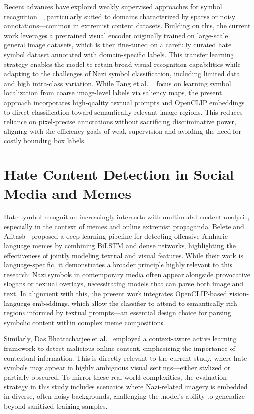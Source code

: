 Recent advances have explored weakly supervised approaches for symbol recognition
~\parencite{tang2017multipleinstancedetectionnetwork}, particularly suited to domains characterized by sparse or
noisy annotations—common in extremist content datasets. Building on this, the current work leverages a pretrained
visual encoder originally trained on large-scale general image datasets, which is then fine-tuned on a carefully
curated hate symbol dataset annotated with domain-specific labels. This transfer learning strategy enables the model
to retain broad visual recognition capabilities while adapting to the challenges of Nazi symbol classification,
including limited data and high intra-class variation. While Tang et al.
~\parencite{tang2017multipleinstancedetectionnetwork} focus on learning symbol localization from coarse image-level
labels via saliency maps, the present approach incorporates high-quality textual prompts and OpenCLIP embeddings to
direct classification toward semantically relevant image regions. This reduces reliance on pixel-precise annotations
without sacrificing discriminative power, aligning with the efficiency goals of weak supervision and avoiding the
need for costly bounding box labels.

\section{Hate Content Detection in Social Media and Memes}

Hate symbol recognition increasingly intersects with multimodal content analysis, especially in the context of memes
and online extremist propaganda. Belete and Alitasb~\parencite{belete2025200258} proposed a deep learning pipeline
for detecting offensive Amharic-language memes by combining \ac{BiLSTM} and dense networks, highlighting the
effectiveness of jointly modeling textual and visual features. While their work is language-specific, it
demonstrates a broader principle highly relevant to this research: Nazi symbols in contemporary media often appear
alongside provocative slogans or textual overlays, necessitating models that can parse both image and text. In
alignment with this, the present work integrates OpenCLIP-based vision-language embeddings, which allow the
classifier to attend to semantically rich regions informed by textual prompts—an essential design choice for parsing
symbolic content within complex meme compositions.

Similarly, Das Bhattacharjee et al.~\parencite{dasbhattacharjee2019365} employed a context-aware active learning
framework to detect malicious online content, emphasizing the importance of contextual information. This is directly
relevant to the current study, where hate symbols may appear in highly ambiguous visual settings—either stylized or
partially obscured. To mirror these real-world complexities, the evaluation strategy in this study includes
scenarios where Nazi-related imagery is embedded in diverse, often noisy backgrounds, challenging the model’s
ability to generalize beyond sanitized training samples.

